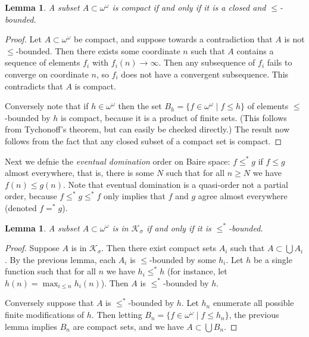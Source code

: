 \documentclass[11pt,oneside,a4paper]{amsbook}
\newcommand{\R}{\mathbb R}
\theoremstyle{definition}
\theoremstyle{plain}
\newtheorem{lemma}[theorem]{Lemma}
\theoremstyle{definition}
\theoremstyle{remark}
\numberwithin{equation}{section}
\numberwithin{figure}{section}
\begin{document}

\begin{lemma}
  \label{lem:baire-compact}
  A subset $A\subset\omega^\omega$ is compact if and only if it is a closed and $\leq$-bounded.
\end{lemma}

\begin{proof}
  Let $A\subset\omega^\omega$ be compact, and suppose towards a contradiction that $A$ is not $\leq$-bounded. Then there exists some coordinate $n$ such that $A$ contains a sequence of elements $f_i$ with $f_i(n)\to\infty$. Then any subsequence of $f_i$ fails to converge on coordinate $n$, so $f_i$ does not have a convergent subsequence. This contradicts that $A$ is compact.

  Conversely note that if $h\in\omega^\omega$ then the set $B_h=\{f\in\omega^\omega\mid f\leq h\}$ of elements $\leq$-bounded by $h$ is compact, because it is a product of finite sets. (This follows from Tychonoff's theorem, but can easily be checked directly.) The result now follows from the fact that any closed subset of a compact set is compact.
\end{proof}

Next we defnie the \emph{eventual domination} order on Baire space: $f\leq^*g$ if $f\leq g$ almost everywhere, that is, there is some $N$ such that for all $n\geq N$ we have $f(n)\leq g(n)$. Note that eventual domination is a quasi-order not a partial order, because $f\leq^*g\leq^*f$ only implies that $f$ and $g$ agree almost everywhere (denoted $f=^*g$).

\begin{lemma}
  \label{lem:sigma-compact-bounded}
  A subset $A\subset\omega^\omega$ is in $\mathcal K_\sigma$ if and only if it is $\leq^*$-bounded.
\end{lemma}

\begin{proof}
  Suppose $A$ is in $\mathcal K_\sigma$. Then there exist compact sets $A_i$ such that $A\subset\bigcup A_i$. By the previous lemma, each $A_i$ is $\leq$-bounded by some $h_i$. Let $h$ be a single function such that for all $n$ we have $h_i\leq^* h$ (for instance, let $h(n)=\max_{i\leq n}h_i(n)$). Then $A$ is $\leq^*$-bounded by $h$.

  Conversely suppose that $A$ is $\leq^*$-bounded by $h$. Let $h_n$ enumerate all possible finite modifications of $h$. Then letting $B_n=\{f\in\omega^\omega\mid f\leq h_n\}$, the previous lemma implies $B_n$ are compact sets, and we have $A\subset\bigcup B_n$.
\end{proof}
\end{document}
